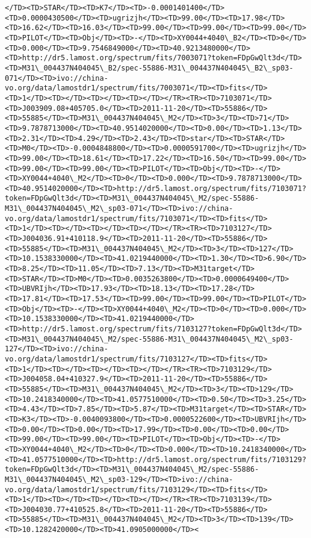 \documentclass[11pt]{article}
\begin{document}
\begin{Verbatim}[commandchars=\\\{\}]
</TD><TD>STAR</TD><TD>K7</TD><TD>-0.0001401400</TD><TD>0.0000430500</TD><TD>ugrizjh</TD><TD>99.00</TD><TD>17.98</TD><TD>16.62</TD><TD>16.03</TD><TD>99.00</TD><TD>99.00</TD><TD>99.00</TD><TD>PILOT</TD><TD>Obj</TD><TD>-</TD><TD>XY0044+4040\_B2</TD><TD>0</TD><TD>0.000</TD><TD>9.7546849000</TD><TD>40.9213480000</TD><TD>http://dr5.lamost.org/spectrum/fits/7003071?token=FDpGwQlt3d</TD><TD>M31\_004437N404045\_B2/spec-55886-M31\_004437N404045\_B2\_sp03-071</TD><TD>ivo://china-vo.org/data/lamostdr1/spectrum/fits/7003071</TD><TD>fits</TD><TD>1</TD><TD></TD><TD></TD><TD></TD></TR><TR><TD>7103071</TD><TD>J003909.08+405705.0</TD><TD>2011-11-20</TD><TD>55886</TD><TD>55885</TD><TD>M31\_004437N404045\_M2</TD><TD>3</TD><TD>71</TD><TD>9.7878713000</TD><TD>40.9514020000</TD><TD>0.00</TD><TD>1.13</TD><TD>2.31</TD><TD>4.29</TD><TD>2.43</TD><TD>star</TD><TD>STAR</TD><TD>M0</TD><TD>-0.0004848800</TD><TD>0.0000591700</TD><TD>ugrizjh</TD><TD>99.00</TD><TD>18.61</TD><TD>17.22</TD><TD>16.50</TD><TD>99.00</TD><TD>99.00</TD><TD>99.00</TD><TD>PILOT</TD><TD>Obj</TD><TD>-</TD><TD>XY0044+4040\_M2</TD><TD>0</TD><TD>0.000</TD><TD>9.7878713000</TD><TD>40.9514020000</TD><TD>http://dr5.lamost.org/spectrum/fits/7103071?token=FDpGwQlt3d</TD><TD>M31\_004437N404045\_M2/spec-55886-M31\_004437N404045\_M2\_sp03-071</TD><TD>ivo://china-vo.org/data/lamostdr1/spectrum/fits/7103071</TD><TD>fits</TD><TD>1</TD><TD></TD><TD></TD><TD></TD></TR><TR><TD>7103127</TD><TD>J004036.91+410118.9</TD><TD>2011-11-20</TD><TD>55886</TD><TD>55885</TD><TD>M31\_004437N404045\_M2</TD><TD>3</TD><TD>127</TD><TD>10.1538330000</TD><TD>41.0219440000</TD><TD>1.30</TD><TD>6.90</TD><TD>8.25</TD><TD>11.05</TD><TD>7.13</TD><TD>M31target</TD><TD>STAR</TD><TD>M0</TD><TD>0.0035263800</TD><TD>0.0000649400</TD><TD>UBVRIjh</TD><TD>17.93</TD><TD>18.13</TD><TD>17.28</TD><TD>17.81</TD><TD>17.53</TD><TD>99.00</TD><TD>99.00</TD><TD>PILOT</TD><TD>Obj</TD><TD>-</TD><TD>XY0044+4040\_M2</TD><TD>0</TD><TD>0.000</TD><TD>10.1538330000</TD><TD>41.0219440000</TD><TD>http://dr5.lamost.org/spectrum/fits/7103127?token=FDpGwQlt3d</TD><TD>M31\_004437N404045\_M2/spec-55886-M31\_004437N404045\_M2\_sp03-127</TD><TD>ivo://china-vo.org/data/lamostdr1/spectrum/fits/7103127</TD><TD>fits</TD><TD>1</TD><TD></TD><TD></TD><TD></TD></TR><TR><TD>7103129</TD><TD>J004058.04+410327.9</TD><TD>2011-11-20</TD><TD>55886</TD><TD>55885</TD><TD>M31\_004437N404045\_M2</TD><TD>3</TD><TD>129</TD><TD>10.2418340000</TD><TD>41.0577510000</TD><TD>0.50</TD><TD>3.25</TD><TD>4.43</TD><TD>7.85</TD><TD>5.87</TD><TD>M31target</TD><TD>STAR</TD><TD>K3</TD><TD>-0.0040093800</TD><TD>0.0000522600</TD><TD>UBVRIjh</TD><TD>0.00</TD><TD>0.00</TD><TD>17.99</TD><TD>0.00</TD><TD>0.00</TD><TD>99.00</TD><TD>99.00</TD><TD>PILOT</TD><TD>Obj</TD><TD>-</TD><TD>XY0044+4040\_M2</TD><TD>0</TD><TD>0.000</TD><TD>10.2418340000</TD><TD>41.0577510000</TD><TD>http://dr5.lamost.org/spectrum/fits/7103129?token=FDpGwQlt3d</TD><TD>M31\_004437N404045\_M2/spec-55886-M31\_004437N404045\_M2\_sp03-129</TD><TD>ivo://china-vo.org/data/lamostdr1/spectrum/fits/7103129</TD><TD>fits</TD><TD>1</TD><TD></TD><TD></TD><TD></TD></TR><TR><TD>7103139</TD><TD>J004030.77+410525.8</TD><TD>2011-11-20</TD><TD>55886</TD><TD>55885</TD><TD>M31\_004437N404045\_M2</TD><TD>3</TD><TD>139</TD><TD>10.1282420000</TD><TD>41.0905000000</TD><
\end{Verbatim}
\end{document}
